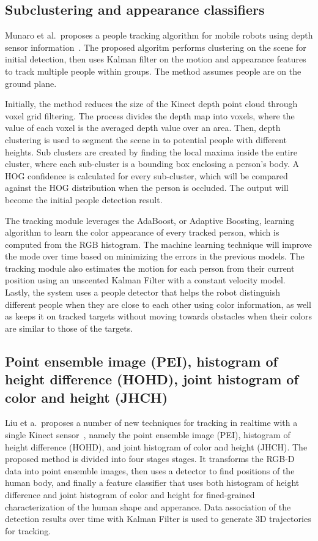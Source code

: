 \subsection{Subclustering and appearance classifiers}

Munaro et al.\ proposes a people tracking algorithm for mobile robots using depth sensor information~\cite{munaro_tracking_within_groups_with_mobile_robot}. The proposed algoritm performs clustering on the scene for initial detection, then uses Kalman filter on the motion and appearance features to track multiple people within groups. The method assumes people are on the ground plane.

Initially, the method reduces the size of the Kinect depth point cloud through voxel grid filtering. The process divides the depth map into voxels, where the value of each voxel is the averaged depth value over an area. Then, depth clustering is used to segment the scene in to potential people with different heights. Sub clusters are created by finding the local maxima inside the entire cluster, where each sub-cluster is a bounding box enclosing a person's body. A HOG confidence is calculated for every sub-cluster, which will be compared against the HOG distribution when the person is occluded. The output will become the initial people detection result.

The tracking module leverages the AdaBoost, or Adaptive Boosting, learning algorithm to learn the color appearance of every tracked person, which is computed from the RGB histogram. The machine learning technique will improve the mode over time based on minimizing the errors in the previous models. The tracking module also estimates the motion for each person from their current position using an unscented Kalman Filter with a constant velocity model. Lastly, the system uses a people detector that helps the robot distinguish different people when they are close to each other using color information, as well as keeps it on tracked targets without moving towards obstacles when their colors are similar to those of the targets.

\subsection{Point ensemble image (PEI), histogram of height difference (HOHD), joint histogram of color and height (JHCH)}

Liu et a.\ proposes a number of new techniques for tracking in realtime with a single Kinect sensor~\cite{liu_tracking_with_pei}, namely the point ensemble image (PEI), histogram of height difference (HOHD), and joint histogram of color and height (JHCH). The proposed method is divided into four stages stages. It transforms the RGB-D data into point ensemble images, then uses a detector to find positions of the human body, and finally a feature classifier that uses both histogram of height difference and joint histogram of color and height for fined-grained characterization of the human shape and apperance. Data association of the detection results over time with Kalman Filter is used to generate 3D trajectories for tracking.

